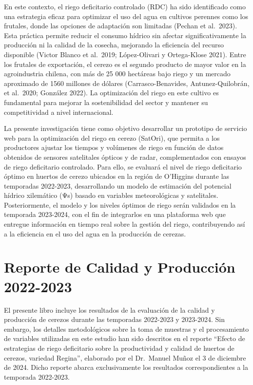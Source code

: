 \documentclass[
  letterpaper,
  DIV=11,
  numbers=noendperiod]{scrreprt}
\begin{document}
En este contexto, el riego deficitario controlado (RDC) ha sido
identificado como una estrategia eficaz para optimizar el uso del agua
en cultivos perennes como los frutales, donde las opciones de adaptación
son limitadas (Pechan et al.~2023). Esta práctica permite reducir el
consumo hídrico sin afectar significativamente la producción ni la
calidad de la cosecha, mejorando la eficiencia del recurso disponible
(Victor Blanco et al.~2019; López-Olivari y Ortega-Klose 2021). Entre
los frutales de exportación, el cerezo es el segundo producto de mayor
valor en la agroindustria chilena, con más de 25 000 hectáreas bajo
riego y un mercado aproximado de 1560 millones de dólares
(Carrasco-Benavides, Antunez-Quilobrán, et al.~2020; González 2022). La
optimización del riego en este cultivo es fundamental para mejorar la
sostenibilidad del sector y mantener su competitividad a nivel
internacional.

La presente investigación tiene como objetivo desarrollar un prototipo
de servicio web para la optimización del riego en cerezo (SatOri), que
permita a los productores ajustar los tiempos y volúmenes de riego en
función de datos obtenidos de sensores satelitales ópticos y de radar,
complementados con ensayos de riego deficitario controlado. Para ello,
se evaluará el nivel de riego deficitario óptimo en huertos de cerezo
ubicados en la región de O'Higgins durante las temporadas 2022-2023,
desarrollando un modelo de estimación del potencial hídrico xilemático
(Ψs) basado en variables meteorológicas y satelitales. Posteriormente,
el modelo y los niveles óptimos de riego serán validados en la temporada
2023-2024, con el fin de integrarlos en una plataforma web que entregue
información en tiempo real sobre la gestión del riego, contribuyendo así
a la eficiencia en el uso del agua en la producción de cerezas.

\part{Reporte de Calidad y Producción 2022-2023}

El presente libro incluye los resultados de la evaluación de la calidad
y producción de cerezos durante las temporadas 2022-2023 y 2023-2024.
Sin embargo, los detalles metodológicos sobre la toma de muestras y el
procesamiento de variables utilizadas en este estudio han sido descritos
en el reporte ``Efecto de estrategias de riego deficitario sobre la
productividad y calidad de huertos de cerezos, variedad Regina'',
elaborado por el Dr.~Manuel Muñoz el 3 de diciembre de 2024. Dicho
reporte abarca exclusivamente los resultados correspondientes a la
temporada 2022-2023.
\end{document}
